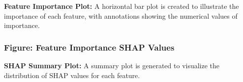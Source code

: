 \documentclass[letterpaper]{article}
\begin{document}
\textbf{Feature Importance Plot:} A horizontal bar plot is created to illustrate the importance of each feature, with
annotations showing the numerical values of importance.


\bigskip

\centering
{}
\par
\subsubsection[]{\rmfamily }
\subsubsection[Figure: Feature Importance SHAP Values]{\textbf{Figure:} Feature Importance SHAP Values}

\bigskip


\bigskip


\bigskip


\bigskip


\bigskip


\bigskip


\bigskip

\textbf{SHAP Summary Plot:} A summary plot is generated to visualize the distribution of SHAP values for each feature.


\bigskip


\bigskip
\end{document}
